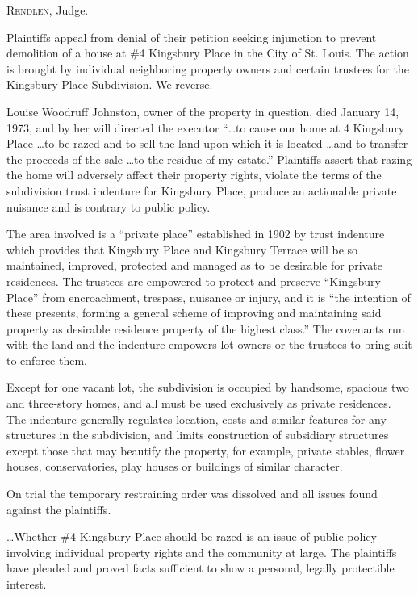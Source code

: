 
\opinion \textsc{Rendlen}, Judge.

Plaintiffs appeal from denial of their petition seeking injunction to prevent
demolition of a house at \#4 Kingsbury Place in the City of St. Louis. The
action is brought by individual neighboring property owners and certain
trustees for the Kingsbury Place Subdivision. We reverse.

Louise Woodruff Johnston, owner of the property in question, died January 14,
1973, and by her will directed the executor ``\ldots to cause our home at 4
Kingsbury Place \ldots to be razed and to sell the land upon which it is located
\ldots and to transfer the proceeds of the sale \ldots to the residue of my
estate.'' Plaintiffs assert that razing the home will adversely affect their
property rights, violate the terms of the subdivision trust indenture for
Kingsbury Place, produce an actionable private nuisance and is contrary to
public policy.

The area involved is a ``private place'' established in 1902 by trust indenture
which provides that Kingsbury Place and Kingsbury Terrace will be so
maintained, improved, protected and managed as to be desirable for private
residences. The trustees are empowered to protect and preserve ``Kingsbury
Place'' from encroachment, trespass, nuisance or injury, and it is ``the
intention of these presents, forming a general scheme of improving and
maintaining said property as desirable residence property of the highest
class.'' The covenants run with the land and the indenture empowers lot owners
or the trustees to bring suit to enforce them.

Except for one vacant lot, the subdivision is occupied by handsome, spacious two
and three-story homes, and all must be used exclusively as private residences.
The indenture generally regulates location, costs and similar features for any
structures in the subdivision, and limits construction of subsidiary structures
except those that may beautify the property, for example, private stables,
flower houses, conservatories, play houses or buildings of similar character.

On trial the temporary restraining order was dissolved and all issues found
against the plaintiffs.

\ldots Whether \#4 Kingsbury Place should be razed is an issue of public policy
involving individual property rights and the community at large. The plaintiffs
have pleaded and proved facts sufficient to show a personal, legally
protectible interest.

